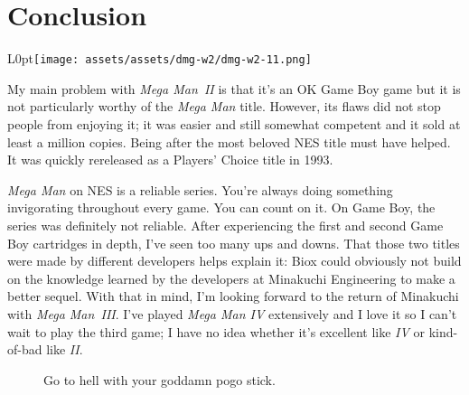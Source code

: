 \documentclass{book}
\begin{document}
\FloatBarrier\section*{Conclusion}
\begin{wrapfigure}{L}{0pt}{\texttt{[image: assets/assets/dmg-w2/dmg-w2-11.png]}}\end{wrapfigure}\noindent
My main problem with \emph{Mega Man~II} is that it’s an OK Game Boy game but it is not particularly worthy of the \emph{Mega Man} title. However, its flaws did not stop people from enjoying it; it was easier and still somewhat competent and it sold at least a million copies. Being after the most beloved NES title must have helped. It was quickly rereleased as a Players’ Choice title in 1993.\par
\emph{Mega Man} on NES is a reliable series. You’re always doing something invigorating throughout every game. You can count on it. On Game Boy, the series was definitely not reliable. After experiencing the first and second Game Boy cartridges in depth, I’ve seen too many ups and downs. That those two titles were made by different developers helps explain it: Biox could obviously not build on the knowledge learned by the developers at Minakuchi Engineering to make a better sequel. With that in mind, I’m looking forward to the return of Minakuchi with \emph{Mega Man~III}. I’ve played \emph{Mega Man IV} extensively and I love it so I can’t wait to play the third game; I have no idea whether it’s excellent like \emph{IV} or kind-of-bad like \emph{II}.\par
\FloatBarrier\vspace{\baselineskip}\begin{figure}[H]\caption*{Go to hell with your goddamn pogo stick.}\end{figure}
\end{document}
